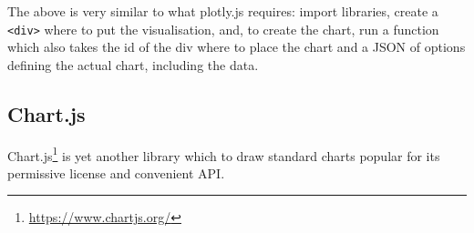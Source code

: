 \documentclass[
]{krantz}
\renewcommand{\href}[2]{#2\footnote{\url{#1}}}
\begin{document}
The above is very similar to what plotly.js requires: import libraries, create a \texttt{\textless{}div\textgreater{}} where to put the visualisation, and, to create the chart, run a function which also takes the id of the div where to place the chart and a JSON of options defining the actual chart, including the data.

\hypertarget{widgets-basics-candidates-chart.js}{%
\subsection{Chart.js}\label{widgets-basics-candidates-chart.js}}

\href{https://www.chartjs.org/}{Chart.js} is yet another library which to draw standard charts popular for its permissive license and convenient API.
\end{document}
